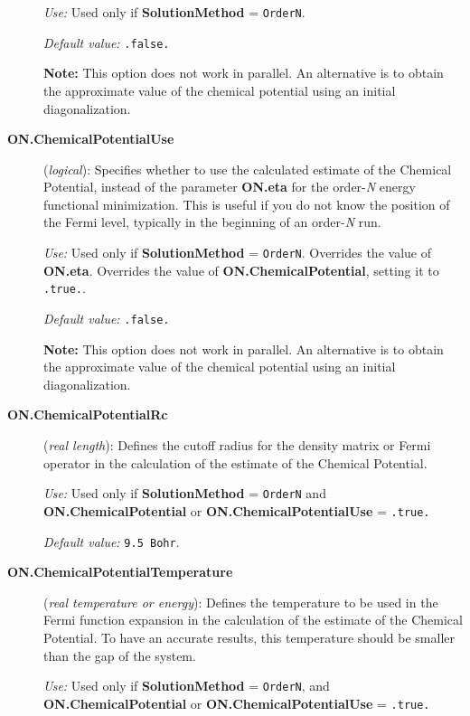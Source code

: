 \documentclass[11pt]{article}
\begin{document}
\begin{description}
{\it Use:} Used only if {\bf SolutionMethod} = {\tt OrderN}.

{\it Default value:} {\tt .false.}

{\bf Note:} This option does not work in parallel. An alternative
is to obtain the approximate value of the chemical potential using
an initial diagonalization.


\item[{\bf ON.ChemicalPotentialUse}] ({\it logical}):
Specifies whether to use the calculated estimate of the
Chemical Potential, instead of the parameter
{\bf ON.eta}
for the order-{\it N} energy functional minimization.
This is useful if you do not know the position
of the Fermi level, typically in the beginning
of an order-{\em N} run.

{\it Use:} Used only if {\bf SolutionMethod} = {\tt OrderN}.
Overrides the value of {\bf ON.eta}.
Overrides the value of {\bf ON.ChemicalPotential}, setting
it to {\tt .true.}.

{\it Default value:} {\tt .false.}

{\bf Note:} This option does not work in parallel. An alternative
is to obtain the approximate value of the chemical potential using
an initial diagonalization.

\item[{\bf ON.ChemicalPotentialRc}]  ({\it real length}):
Defines the cutoff radius for the density matrix or Fermi
operator in the calculation of the estimate of the
Chemical Potential.

{\it Use:} Used only if {\bf SolutionMethod} = {\tt OrderN}
and {\bf ON.ChemicalPotential} or  {\bf ON.ChemicalPotentialUse}
= {\tt .true.}

{\it Default value:} {\tt 9.5 Bohr}.

\item[{\bf ON.ChemicalPotentialTemperature}]  ({\it real temperature
or energy}):
Defines the temperature to be used in the Fermi function expansion
in the calculation of the estimate of the Chemical Potential.
To have an accurate results, this temperature should be smaller
than the gap of the system.

{\it Use:} Used only if {\bf SolutionMethod} = {\tt OrderN},
and {\bf ON.ChemicalPotential} or  {\bf ON.ChemicalPotentialUse} =
{\tt .true.}


\end{description}
\end{document}
